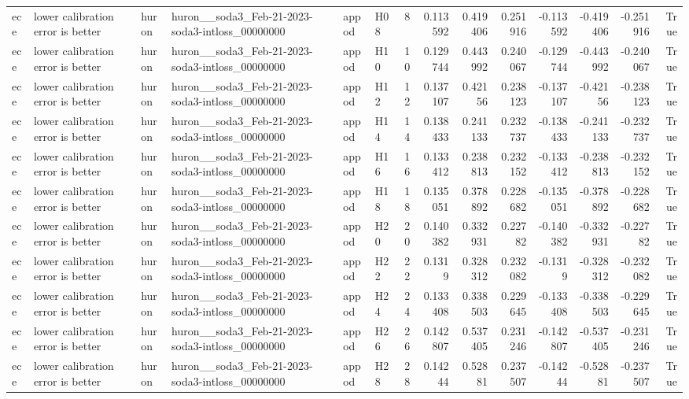 \begin{longtable}{llllllrrrrrrrr}
ece & lower calibration error is better & huron & huron\_\_soda3\_Feb-21-2023-soda3-intloss\_00000000 & appod & H08 & 8 & 0.113592 & 0.419406 & 0.251916 & -0.113592 & -0.419406 & -0.251916 & True \\
ece & lower calibration error is better & huron & huron\_\_soda3\_Feb-21-2023-soda3-intloss\_00000000 & appod & H10 & 10 & 0.129744 & 0.443992 & 0.240067 & -0.129744 & -0.443992 & -0.240067 & True \\
ece & lower calibration error is better & huron & huron\_\_soda3\_Feb-21-2023-soda3-intloss\_00000000 & appod & H12 & 12 & 0.137107 & 0.42156 & 0.238123 & -0.137107 & -0.42156 & -0.238123 & True \\
ece & lower calibration error is better & huron & huron\_\_soda3\_Feb-21-2023-soda3-intloss\_00000000 & appod & H14 & 14 & 0.138433 & 0.241133 & 0.232737 & -0.138433 & -0.241133 & -0.232737 & True \\
ece & lower calibration error is better & huron & huron\_\_soda3\_Feb-21-2023-soda3-intloss\_00000000 & appod & H16 & 16 & 0.133412 & 0.238813 & 0.232152 & -0.133412 & -0.238813 & -0.232152 & True \\
ece & lower calibration error is better & huron & huron\_\_soda3\_Feb-21-2023-soda3-intloss\_00000000 & appod & H18 & 18 & 0.135051 & 0.378892 & 0.228682 & -0.135051 & -0.378892 & -0.228682 & True \\
ece & lower calibration error is better & huron & huron\_\_soda3\_Feb-21-2023-soda3-intloss\_00000000 & appod & H20 & 20 & 0.140382 & 0.332931 & 0.22782 & -0.140382 & -0.332931 & -0.22782 & True \\
ece & lower calibration error is better & huron & huron\_\_soda3\_Feb-21-2023-soda3-intloss\_00000000 & appod & H22 & 22 & 0.1319 & 0.328312 & 0.232082 & -0.1319 & -0.328312 & -0.232082 & True \\
ece & lower calibration error is better & huron & huron\_\_soda3\_Feb-21-2023-soda3-intloss\_00000000 & appod & H24 & 24 & 0.133408 & 0.338503 & 0.229645 & -0.133408 & -0.338503 & -0.229645 & True \\
ece & lower calibration error is better & huron & huron\_\_soda3\_Feb-21-2023-soda3-intloss\_00000000 & appod & H26 & 26 & 0.142807 & 0.537405 & 0.231246 & -0.142807 & -0.537405 & -0.231246 & True \\
ece & lower calibration error is better & huron & huron\_\_soda3\_Feb-21-2023-soda3-intloss\_00000000 & appod & H28 & 28 & 0.14244 & 0.52881 & 0.237507 & -0.14244 & -0.52881 & -0.237507 & True \\

\end{longtable}
